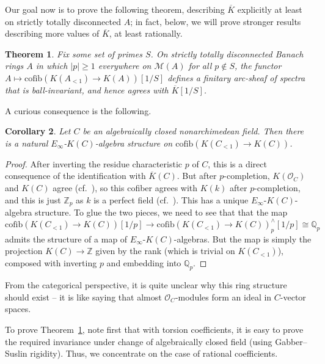 \documentclass[11pt]{amsart}
\numberwithin{equation}{section}
\newtheorem{theorem}{Theorem}
\numberwithin{theorem}{section}
\newtheorem{corollary}[theorem]{Corollary}
\theoremstyle{definition}
\begin{document}
Our goal now is to prove the following theorem, describing $\overline{K}$ explicitly at least on strictly totally disconnected $A$; in fact, below, we will prove stronger results describing more values of $\overline{K}$, at least rationally.

\begin{theorem}\label{thm:explicitKbar} Fix some set of primes $S$. On strictly totally disconnected Banach rings $A$ in which $|p|\geq 1$ everywhere on $\mathcal M(A)$ for all $p\not\in S$, the functor $A\mapsto \mathrm{cofib}(K(A_{<1})\to K(A))[1/S]$ defines a finitary arc-sheaf of spectra that is ball-invariant, and hence agrees with $\overline{K}[1/S]$.
\end{theorem}

A curious consequence is the following.

\begin{corollary} Let $C$ be an algebraically closed nonarchimedean field. Then there is a natural $E_\infty$-$K(C)$-algebra structure on $\mathrm{cofib}(K(C_{<1})\to K(C))$.
\end{corollary}

\begin{proof} After inverting the residue characteristic $p$ of $C$, this is a direct consequence of the identification with $\overline{K}(C)$. But after $p$-completion, $K(\mathcal O_C)$ and $K(C)$ agree (cf.~\cite[Lemma 1.3.7]{HesselholtNikolaus}), so this cofiber agrees with $K(k)$ after $p$-completion, and this is just $\mathbb Z_p$ as $k$ is a perfect field (cf.~\cite[Corollaire 5.5]{Kratzer}). This has a unique $E_\infty$-$K(C)$-algebra structure. To glue the two pieces, we need to see that that the map
\[
\mathrm{cofib}(K(C_{<1})\to K(C))[1/p]\to \mathrm{cofib}(K(C_{<1})\to K(C))^\wedge_p[1/p]\cong \mathbb Q_p
\]
admits the structure of a map of $E_\infty$-$K(C)$-algebras. But the map is simply the projection $K(C)\to \mathbb Z$ given by the rank (which is trivial on $K(C_{<1})$), composed with inverting $p$ and embedding into $\mathbb Q_p$.
\end{proof}

From the categorical perspective, it is quite unclear why this ring structure should exist -- it is like saying that almost $\mathcal O_C$-modules form an ideal in $C$-vector spaces.

To prove Theorem~\ref{thm:explicitKbar}, note first that with torsion coefficients, it is easy to prove the required invariance under change of algebraically closed field (using Gabber--Suslin rigidity). Thus, we concentrate on the case of rational coefficients.
\end{document}

